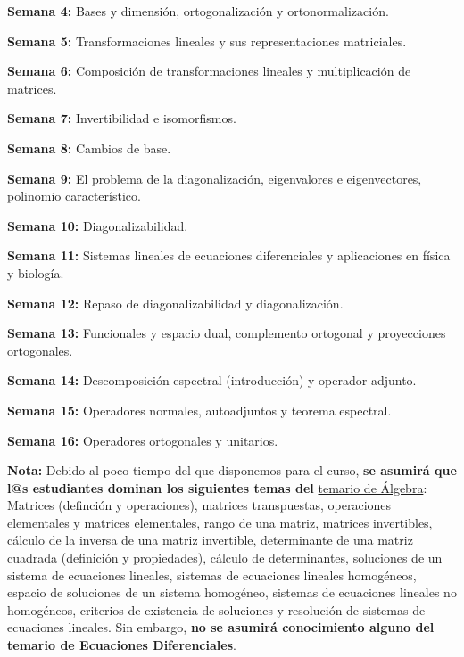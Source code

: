 \documentclass[12pt,dvipsnames]{article}
\begin{document}
\vspace{3mm}
\textbf{Semana 4:}  Bases y dimensión, ortogonalización y ortonormalización.

\vspace{3mm}
\textbf{Semana 5:}  Transformaciones lineales y sus representaciones matriciales.

\vspace{3mm}
\textbf{Semana 6:}  Composición de transformaciones lineales y multiplicación de matrices.

\vspace{3mm}
\textbf{Semana 7:}  Invertibilidad e isomorfismos.

\vspace{3mm}
\textbf{Semana 8:} Cambios de base.

\vspace{3mm}
\textbf{Semana 9:} El problema de la diagonalización, eigenvalores e eigenvectores, polinomio característico.

\vspace{3mm}
\textbf{Semana 10:} Diagonalizabilidad.

\vspace{3mm}
\textbf{Semana 11:} Sistemas lineales de ecuaciones diferenciales y aplicaciones en física y biología.

\vspace{3mm}
\textbf{Semana 12:} Repaso de diagonalizabilidad y diagonalización.

\vspace{3mm}
\textbf{Semana 13:} Funcionales y espacio dual, complemento ortogonal y proyecciones ortogonales.

\vspace{3mm}
\textbf{Semana 14:} Descomposición espectral (introducción) y operador adjunto.

\vspace{3mm}
\textbf{Semana 15:} Operadores normales, autoadjuntos y teorema espectral.

\vspace{3mm}
\textbf{Semana 16:} Operadores ortogonales y unitarios.

\vspace{3mm}
\textbf{Nota:} Debido al poco tiempo del que disponemos para el curso, \textbf{se asumirá que l@s estudiantes dominan los siguientes temas del} \href{https://web.fciencias.unam.mx/asignaturas/1130.pdf}{temario de Álgebra}: Matrices (definción y operaciones), matrices transpuestas, operaciones elementales y matrices elementales, rango de una matriz, matrices invertibles, cálculo de la inversa de una matriz invertible, determinante de una matriz cuadrada (definición y propiedades), cálculo de determinantes, soluciones de un sistema de ecuaciones lineales, sistemas de ecuaciones lineales homogéneos, espacio de soluciones de un sistema homogéneo, sistemas de ecuaciones lineales no homogéneos, criterios de existencia de soluciones y resolución de sistemas de ecuaciones lineales. Sin embargo, \textbf{no se asumirá conocimiento alguno del temario de Ecuaciones Diferenciales}.
\end{document}
